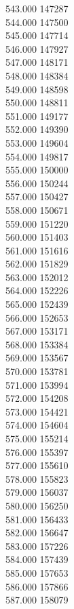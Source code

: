 { 543.000	147287 \\
 544.000	147500 \\
 545.000	147714 \\
 546.000	147927 \\
 547.000	148171 \\
 548.000	148384 \\
 549.000	148598 \\
 550.000	148811 \\
 551.000	149177 \\
 552.000	149390 \\
 553.000	149604 \\
 554.000	149817 \\
 555.000	150000 \\
 556.000	150244 \\
 557.000	150427 \\
 558.000	150671 \\
 559.000	151220 \\
 560.000	151403 \\
 561.000	151616 \\
 562.000	151829 \\
 563.000	152012 \\
 564.000	152226 \\
 565.000	152439 \\
 566.000	152653 \\
 567.000	153171 \\
 568.000	153384 \\
 569.000	153567 \\
 570.000	153781 \\
 571.000	153994 \\
 572.000	154208 \\
 573.000	154421 \\
 574.000	154604 \\
 575.000	155214 \\
 576.000	155397 \\
 577.000	155610 \\
 578.000	155823 \\
 579.000	156037 \\
 580.000	156250 \\
 581.000	156433 \\
 582.000	156647 \\
 583.000	157226 \\
 584.000	157439 \\
 585.000	157653 \\
 586.000	157866 \\
 587.000	158079 \\
}
